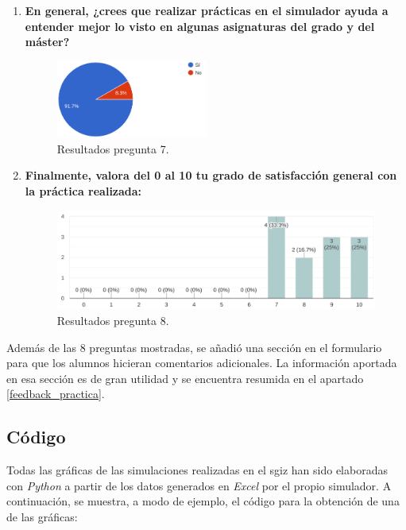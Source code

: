 \begin{enumerate}
    \newpage
    \item \textbf{En general, ¿crees que realizar prácticas en el simulador ayuda a entender mejor lo visto en algunas asignaturas del grado y del máster?}
    
    \begin{figure}[!h]
        \centering
        \includegraphics[width=0.47\textwidth]{content/figures/encuesta_7.png}
        \caption{Resultados pregunta 7.}
        \label{fig:encuesta_7}
    \end{figure}

    \item \textbf{Finalmente, valora del 0 al 10 tu grado de satisfacción general con la práctica realizada:}
    
    \begin{figure}[!h]
        \centering
        \includegraphics[width=\textwidth]{content/figures/encuesta_8.png}
        \caption{Resultados pregunta 8.}
        \label{fig:encuesta_8}
    \end{figure}
\end{enumerate}

Además de las 8 preguntas mostradas, se añadió una sección en el formulario para que los alumnos hicieran comentarios adicionales. La información aportada en esa sección es de gran utilidad y se encuentra resumida en el apartado \ref{feedback_practica}.

\newpage
\subsection{Código} \label{sec:codigo}

Todas las gráficas de las simulaciones realizadas en el \acrshort{sgiz} han sido elaboradas con \textit{Python} a partir de los datos generados en \textit{Excel} por el propio simulador. A continuación, se muestra, a modo de ejemplo, el código para la obtención de una de las gráficas:

